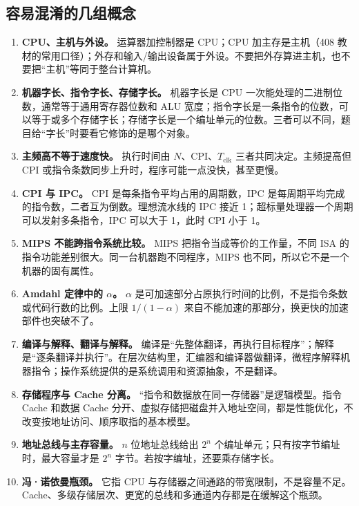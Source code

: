 \subsection{容易混淆的几组概念}

\begin{enumerate}
    \item \textbf{CPU、主机与外设。} 运算器加控制器是 CPU；CPU 加主存是主机（408 教材的常用口径）；外存和输入/输出设备属于外设。不要把外存算进主机，也不要把“主机”等同于整台计算机。
    \item \textbf{机器字长、指令字长、存储字长。} 机器字长是 CPU 一次能处理的二进制位数，通常等于通用寄存器位数和 ALU 宽度；指令字长是一条指令的位数，可以等于或多个存储字长；存储字长是一个编址单元的位数。三者可以不同，题目给“字长”时要看它修饰的是哪个对象。
    \item \textbf{主频高不等于速度快。} 执行时间由 $N$、CPI、$T_{\text{clk}}$ 三者共同决定。主频提高但 CPI 或指令条数同步上升时，程序可能一点没快，甚至更慢。
    \item \textbf{CPI 与 IPC。} CPI 是每条指令平均占用的周期数，IPC 是每周期平均完成的指令数，二者互为倒数。理想流水线的 IPC 接近 1；超标量处理器一个周期可以发射多条指令，IPC 可以大于 1，此时 CPI 小于 1。
    \item \textbf{MIPS 不能跨指令系统比较。} MIPS 把指令当成等价的工作量，不同 ISA 的指令功能差别很大。同一台机器跑不同程序，MIPS 也不同，所以它不是一个机器的固有属性。
    \item \textbf{Amdahl 定律中的 $\alpha$。} $\alpha$ 是可加速部分占原执行时间的比例，不是指令条数或代码行数的比例。上限 $1/(1-\alpha)$ 来自不能加速的那部分，换更快的加速部件也突破不了。
    \item \textbf{编译与解释、翻译与解释。} 编译是“先整体翻译，再执行目标程序”；解释是“逐条翻译并执行”。在层次结构里，汇编器和编译器做翻译，微程序解释机器指令；操作系统提供的是系统调用和资源抽象，不是翻译。
    \item \textbf{存储程序与 Cache 分离。} “指令和数据放在同一存储器”是逻辑模型。指令 Cache 和数据 Cache 分开、虚拟存储把磁盘并入地址空间，都是性能优化，不改变按地址访问、顺序取指的基本模型。
    \item \textbf{地址总线与主存容量。} $n$ 位地址总线给出 $2^n$ 个编址单元；只有按字节编址时，最大容量才是 $2^n$ 字节。若按字编址，还要乘存储字长。
    \item \textbf{冯·诺依曼瓶颈。} 它指 CPU 与存储器之间通路的带宽限制，不是容量不足。Cache、多级存储层次、更宽的总线和多通道内存都是在缓解这个瓶颈。
\end{enumerate}

